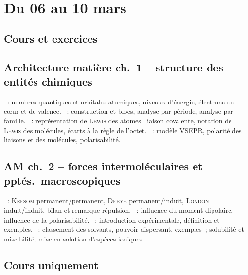 \documentclass[a4paper, 12pt, final, garamond]{book}
\begin{document}
\setcounter{chapter}{19}

\chapter{Du 06 au 10 mars}

\section{Cours et exercices}
\section*{Architecture matière ch.\ 1 -- structure des entités chimiques}
\begin{enumerate}[label=\Roman*]
    ~: nombres quantiques et
        orbitales atomiques, niveaux d'énergie, électrons de cœur et de valence.
    ~: construction et blocs, analyse par période,
        analyse par famille.
    ~: représentation de
        \textsc{Lewis} des atomes, liaison covalente, notation de \textsc{Lewis}
        des molécules, écarts à la règle de l'octet.
    ~: modèle VSEPR, polarité
        des liaisons et des molécules, polarisabilité.
\end{enumerate}

\section*{AM ch.\ 2 -- forces intermoléculaires et pptés.\ macroscopiques}
\begin{enumerate}[label=\Roman*]
    ~: \textsc{Keesom}
        permanent/permanent, \textsc{Debye} permanent/induit, \textsc{London}
        induit/induit, bilan et remarque répulsion.
    ~: influence du moment dipolaire,
        influence de la polarisabilité.
    ~: introduction expérimentale, définition et
        exemples.
    ~: classement des solvants, pouvoir dispersant, exemples~; 
        solubilité et miscibilité, mise en solution d'espèces ioniques.
\end{enumerate}

\section{Cours uniquement}
\end{document}

